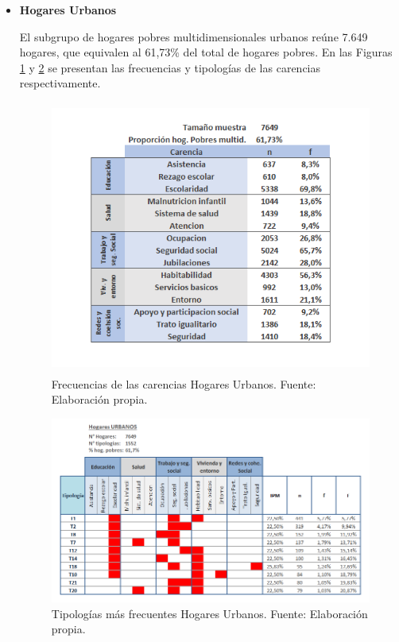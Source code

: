 \documentclass[12pt,letterpaper,spanish]{article}
\begin{document}
\begin{itemize}
    \item \textbf{Hogares Urbanos}
    
    El subgrupo de hogares pobres multidimensionales urbanos reúne 7.649 hogares, que equivalen al 61,73\% del total de hogares pobres. En las Figuras \ref{frenU} y \ref{tipnU} se presentan las frecuencias y tipologías de las carencias respectivamente. 
    
    \begin{figure}[H]
        \centering
        \includegraphics[height=9cm]{HOGARES/tabla_urbano.png}
        \caption{Frecuencias de las carencias Hogares Urbanos. Fuente: Elaboración propia.}
        \label{frenU}
    \end{figure}
    \begin{figure}[H]
        \centering
        \includegraphics[width=\textwidth]{Mati N/Urbano.png}
        \caption{Tipologías más frecuentes Hogares Urbanos. Fuente: Elaboración propia.}
        \label{tipnU}
    \end{figure}
    

\end{itemize}
\end{document}
